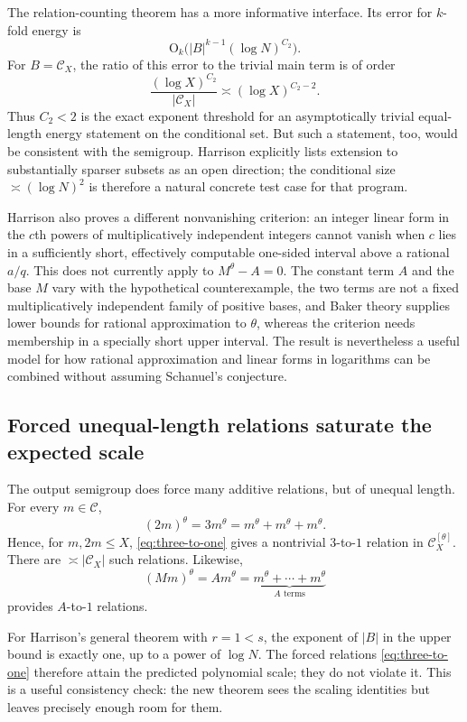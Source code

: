 \documentclass[11pt,oneside]{article}
\theoremstyle{definition}
\theoremstyle{remark}
\newcommand{\Cand}{\mathcal C}
\newcommand{\bigO}{\mathrm O}
\begin{document}
The relation-counting theorem has a more informative interface.  Its error for $k$-fold energy is
\[
  \bigO_k\bigl(|B|^{k-1}(\log N)^{C_2}\bigr).
\]
For $B=\Cand_X$, the ratio of this error to the trivial main term is of order
\[
  \frac{(\log X)^{C_2}}{|\Cand_X|}
  \asymp(\log X)^{C_2-2}.
\]
Thus $C_2<2$ is the exact exponent threshold for an asymptotically trivial equal-length energy statement on the conditional set.  But such a statement, too, would be consistent with the semigroup.  Harrison explicitly lists extension to substantially sparser subsets as an open direction; the conditional size $\asymp(\log N)^2$ is therefore a natural concrete test case for that program.

Harrison also proves a different nonvanishing criterion: an integer linear form in the $c$th powers of multiplicatively independent integers cannot vanish when $c$ lies in a sufficiently short, effectively computable one-sided interval above a rational $a/q$.  This does not currently apply to $M^\theta-A=0$.  The constant term $A$ and the base $M$ vary with the hypothetical counterexample, the two terms are not a fixed multiplicatively independent family of positive bases, and Baker theory supplies lower bounds for rational approximation to $\theta$, whereas the criterion needs membership in a specially short upper interval.  The result is nevertheless a useful model for how rational approximation and linear forms in logarithms can be combined without assuming Schanuel's conjecture.

\subsection{Forced unequal-length relations saturate the expected scale}

The output semigroup does force many additive relations, but of unequal length.  For every $m\in\Cand$,
\begin{equation}
  (2m)^\theta=3m^\theta
  =m^\theta+m^\theta+m^\theta.
  \label{eq:three-to-one}
\end{equation}
Hence, for $m,2m\le X$, \eqref{eq:three-to-one} gives a nontrivial $3$-to-$1$ relation in $\Cand_X^{[\theta]}$.  There are $\asymp|\Cand_X|$ such relations.  Likewise,
\begin{equation}
  (Mm)^\theta=A m^\theta
  =\underbrace{m^\theta+\cdots+m^\theta}_{A\text{ terms}}
  \label{eq:A-to-one}
\end{equation}
provides $A$-to-$1$ relations.

For Harrison's general theorem with $r=1<s$, the exponent of $|B|$ in the upper bound is exactly one, up to a power of $\log N$.  The forced relations \eqref{eq:three-to-one} therefore attain the predicted polynomial scale; they do not violate it.  This is a useful consistency check: the new theorem sees the scaling identities but leaves precisely enough room for them.
\end{document}
